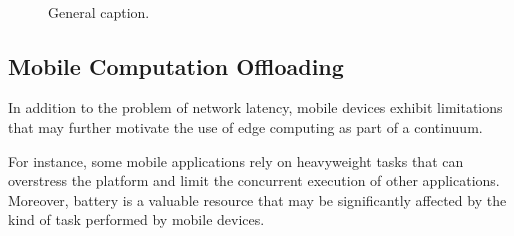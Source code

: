 
\begin{figure}[tbp]
	\centering
	\hfill
	~
	\hfill
	\caption{General caption.} \label{fig:1}
\end{figure}

\subsection{Mobile Computation Offloading}

In addition to the problem of network latency, mobile devices exhibit limitations that may further motivate the use of edge computing as part of a continuum. 

For instance, some mobile applications rely on heavyweight tasks that can overstress the platform and limit the concurrent execution of other applications. Moreover, battery is a valuable resource that may be significantly affected by the kind of task performed by mobile devices. 

